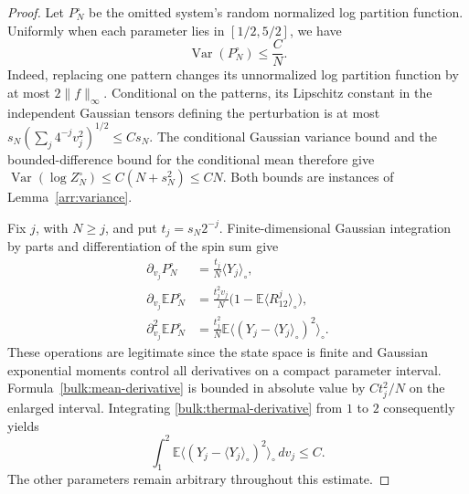 \begin{proof}
Let $P_N^\circ$ be the omitted system's random normalized log partition
function.  Uniformly when each parameter lies in $[1/2,5/2]$, we have
\begin{equation}\label{bulk:concentration}
 \operatorname{Var}(P_N^\circ)\le \frac C N.
\end{equation}
Indeed, replacing one pattern changes its unnormalized log partition
function by at most $2\|f\|_\infty$.  Conditional on the patterns, its
Lipschitz constant in the independent Gaussian tensors defining the
perturbation is at most
$s_N(\sum_j4^{-j}v_j^2)^{1/2}\le Cs_N$.
The conditional Gaussian variance bound and the bounded-difference
bound for the conditional mean therefore give
$\operatorname{Var}(\log Z_N^\circ)\le C(N+s_N^2)\le CN$.
Both bounds are instances of Lemma~\ref{arr:variance}.

Fix $j$, with $N\ge j$, and put $t_j=s_N2^{-j}$.  Finite-dimensional
Gaussian integration by parts and differentiation of the spin sum give
\begin{align}
 \partial_{v_j}P_N^\circ
   &=\frac{t_j}{N}\langle Y_j\rangle_\circ,
   \label{bulk:parameter-derivative}\\
 \partial_{v_j}\mathbb E P_N^\circ
   &=\frac{t_j^2v_j}{N}
       \bigl(1-\mathbb E\langle R_{12}^j\rangle_\circ\bigr),
   \label{bulk:mean-derivative}\\
 \partial_{v_j}^2\mathbb E P_N^\circ
   &=\frac{t_j^2}{N}\mathbb E
      \big\langle(Y_j-\langle Y_j\rangle_\circ)^2\big\rangle_\circ.
   \label{bulk:thermal-derivative}
\end{align}
These operations are legitimate since the state space is finite and
Gaussian exponential moments control all derivatives on a compact
parameter interval.  Formula~\eqref{bulk:mean-derivative} is bounded in
absolute value by $Ct_j^2/N$ on the enlarged interval.  Integrating
\eqref{bulk:thermal-derivative} from $1$ to $2$ consequently yields
\begin{equation}\label{bulk:thermal-integral}
 \int_1^2\mathbb E
 \big\langle(Y_j-\langle Y_j\rangle_\circ)^2\big\rangle_\circ\,dv_j
 \le C.
\end{equation}
The other parameters remain arbitrary throughout this estimate.


\end{proof}
